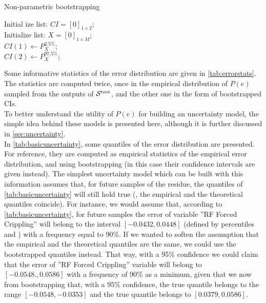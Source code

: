 %
\begin{algorithm}[!htb]
	\caption{Non-parametric bootstrapping}
	\label{algo:bootstrapping}
	
	Initial ize list: $CI=[0]_{1\times 2}$;\\
	Initialize list: $X=[0]_{1\times M}$;\\
	$CI(1)\leftarrow P_{X}^{2.5\%}$;\\
	$CI(2)\leftarrow P_{X}^{97.5\%}$;\\
\end{algorithm}
%
\indent Some informative statistics of the error distribution are given in \autoref{tab:errorstats}. The statistics are computed twice, once in the empirical distribution of $P(e)$ sampled from the outputs of $\cal{S}^\text{test}$, and the other one in the form of bootstrapped CIs.\\
%
\indent To better understand the utility of $P(e)$ for building an uncertainty model, the simple idea behind these models is presented here, although it is further discussed in \autoref{sec:uncertainty}.\\
\indent In \autoref{tab:basicuncertainty}, some quantiles of the error distribution are presented. For reference, they are computed as empirical statistics of the empirical error distribution, and using bootstrapping (in this case their confidence intervals are given instead). The simplest uncertainty model which can be built with this information assumes that, for future samples of the residue, the quantiles of \autoref{tab:basicuncertainty} will still hold true (\ie, the empirical and the theoretical quantiles coincide). For instance, we would assume that, according to \autoref{tab:basicuncertainty}, for future samples the error of variable ''RF Forced Crippling'' will belong to the interval $[-0.0432,0.0448]$ (defined by percentiles  and ) with a frequency equal to 90\%. If we wanted to soften the assumption that the empirical and the theoretical quantiles are the same, we could use the bootstrapped quantiles instead. That way, with a 95\% confidence we could claim that the error of ''RF Forced Crippling'' variable will belong to $[-0.0548.,0.0586]$ with a frequency of 90\% as a minimum, given that we now from bootstrapping that, with a 95\% confidence, the true  quantile belongs to the range $[-0.0548,-0.0353]$ and the true  quantile belongs to $[0.0379,0.0586]$.\\
